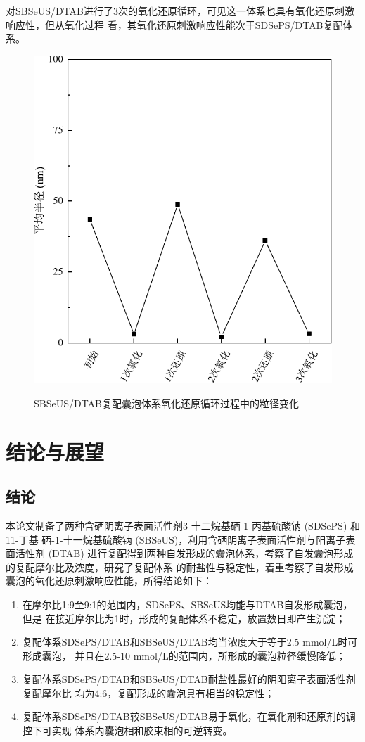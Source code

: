 \documentclass[bachelor,winfonts,replaceperiod]{jnuthesis}
\begin{document}
    对SBSeUS/DTAB进行了3次的氧化还原循环，可见这一体系也具有氧化还原刺激响应性，但从氧化过程
    看，其氧化还原刺激响应性能次于SDSePS/DTAB复配体系。
    \begin{figure}[htbp]
        \centering
        \includegraphics[width=.4\textwidth]{figure/SBSeUS-redox-circle}\\
        \caption{SBSeUS/DTAB复配囊泡体系氧化还原循环过程中的粒径变化}\label{fig:SBSeUS-redox-circle}
    \end{figure}
    
    \chapter{结论与展望}\label{chapter:concludes}
    \section{结论}
    本论文制备了两种含硒阴离子表面活性剂3-十二烷基硒-1-丙基硫酸钠 (SDSePS) 和11-丁基
    硒-1-十一烷基硫酸钠 (SBSeUS)，利用含硒阴离子表面活性剂与阳离子表面活性剂 (DTAB)
    进行复配得到两种自发形成的囊泡体系，考察了自发囊泡形成的复配摩尔比及浓度，研究了复配体系
    的耐盐性与稳定性，着重考察了自发形成囊泡的氧化还原刺激响应性能，所得结论如下：
    \begin{enumerate}
        \item 在摩尔比1:9至9:1的范围内，SDSePS、SBSeUS均能与DTAB自发形成囊泡，但是
        在接近摩尔比为1时，形成的复配体系不稳定，放置数日即产生沉淀；
        \item 复配体系SDSePS/DTAB和SBSeUS/DTAB均当浓度大于等于2.5 mmol/L时可形成囊泡，
        并且在2.5-10 mmol/L的范围内，所形成的囊泡粒径缓慢降低；
        \item 复配体系SDSePS/DTAB和SBSeUS/DTAB耐盐性最好的阴阳离子表面活性剂复配摩尔比
        均为4:6，复配形成的囊泡具有相当的稳定性；
        \item 复配体系SDSePS/DTAB较SBSeUS/DTAB易于氧化，在氧化剂和还原剂的调控下可实现
        体系内囊泡相和胶束相的可逆转变。
    \end{enumerate}
        
\end{document}
